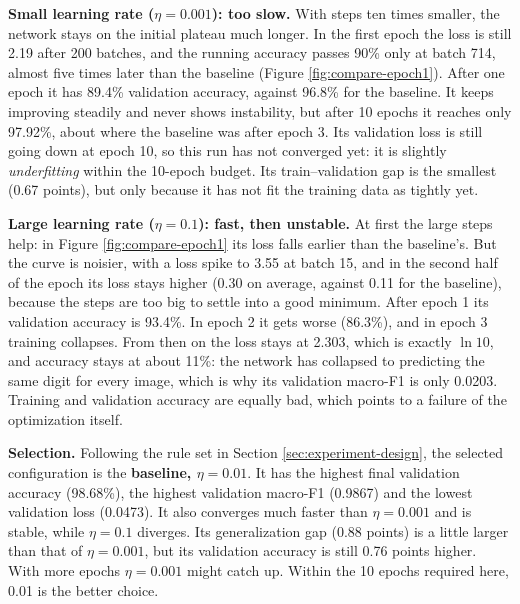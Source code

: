 \textbf{Small learning rate ($\eta = 0.001$): too slow.} With steps ten
times smaller, the network stays on the initial plateau much longer. In
the first epoch the loss is still 2.19 after 200 batches, and the running
accuracy passes 90\% only at batch 714, almost five times later than the
baseline (Figure \ref{fig:compare-epoch1}). After one epoch it has 89.4\%
validation accuracy, against 96.8\% for the baseline. It keeps
improving steadily and never shows instability, but after 10 epochs it
reaches only 97.92\%, about where the baseline was after epoch 3. Its
validation loss is still going down at epoch 10, so this run has not
converged yet: it is slightly \emph{underfitting} within the 10-epoch
budget. Its train--validation gap is the smallest (0.67 points), but
only because it has not fit the training data as tightly yet.

\textbf{Large learning rate ($\eta = 0.1$): fast, then unstable.} At first
the large steps help: in Figure \ref{fig:compare-epoch1} its loss falls
earlier than the baseline's. But the curve is noisier, with a loss spike
to 3.55 at batch 15, and in the second half of the epoch its loss stays
higher (0.30 on average, against 0.11 for the baseline), because the steps are too big
to settle into a good minimum. After epoch 1 its validation accuracy is
93.4\%. In epoch 2 it gets worse (86.3\%), and in epoch 3 training
collapses. From then on the loss stays at 2.303, which is exactly
$\ln 10$, and accuracy stays at about 11\%: the network has collapsed to
predicting the same digit for every image, which is why its validation
macro-F1 is only 0.0203. Training and validation accuracy are equally
bad, which points to a failure of the optimization itself.

\textbf{Selection.} Following the rule set in Section
\ref{sec:experiment-design}, the selected configuration is the
\textbf{baseline, $\eta = 0.01$}. It has the highest final validation
accuracy (98.68\%), the highest validation macro-F1 (0.9867) and the
lowest validation loss (0.0473). It also converges much faster than
$\eta = 0.001$ and is stable, while $\eta = 0.1$ diverges. Its
generalization gap (0.88 points) is a little larger than that of
$\eta = 0.001$, but its validation accuracy is still 0.76 points higher.
With more epochs $\eta = 0.001$ might catch up. Within the 10 epochs
required here, 0.01 is the better choice.
